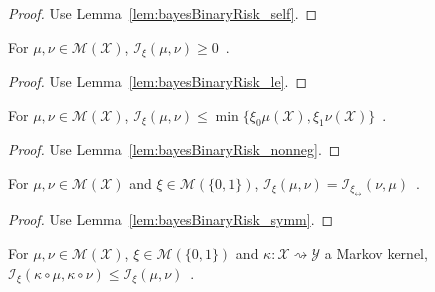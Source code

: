 \begin{proof}\leanok
{}
Use Lemma~\ref{lem:bayesBinaryRisk_self}.
\end{proof}

\begin{lemma}
  \label{lem:statInfo_nonneg}
  For $\mu, \nu \in \mathcal M(\mathcal X)$, $\mathcal I_\xi(\mu, \nu) \ge 0$~.
\end{lemma}

\begin{proof}%
{}
Use Lemma~\ref{lem:bayesBinaryRisk_le}.
\end{proof}


\begin{lemma}
  \label{lem:statInfo_le}
  \leanok
  For $\mu, \nu \in \mathcal M(\mathcal X)$, $\mathcal I_\xi(\mu, \nu) \le \min\{\xi_0 \mu(\mathcal X), \xi_1 \nu(\mathcal X)\}$~.
\end{lemma}

\begin{proof}\leanok
{}
Use Lemma~\ref{lem:bayesBinaryRisk_nonneg}.
\end{proof}


\begin{lemma}
  \label{lem:statInfo_symm}
  \leanok
  For $\mu, \nu \in \mathcal M(\mathcal X)$ and $\xi \in \mathcal M(\{0,1\})$, $\mathcal I_\xi(\mu, \nu) = \mathcal I_{\xi_\leftrightarrow}(\nu, \mu)$~.
\end{lemma}

\begin{proof}\leanok
{}
Use Lemma~\ref{lem:bayesBinaryRisk_symm}.
\end{proof}


\begin{theorem}
  \label{thm:data_proc_statInfo}
  \leanok
  For $\mu, \nu \in \mathcal M(\mathcal X)$, $\xi \in \mathcal M(\{0,1\})$ and $\kappa : \mathcal X \rightsquigarrow \mathcal Y$ a Markov kernel, $\mathcal I_\xi(\kappa \circ \mu, \kappa \circ \nu) \le \mathcal I_\xi(\mu, \nu)$~.
\end{theorem}

